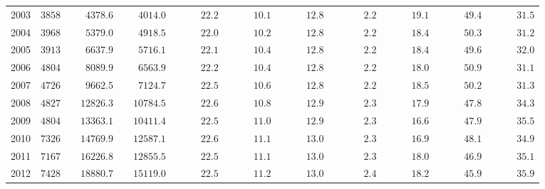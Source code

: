\begin{table}[ht]
{\begin{tabular}{lcccccccccc}
			2003  & $3858$ & $\phantom{000}4378.6$ & $\phantom{000}4014.0$ & $\phantom{00000}22.2$ & $\phantom{00000}10.1$ & $\phantom{00000}12.8$ & $\phantom{000000}2.2$ & $\phantom{00000}19.1$ & $\phantom{00000}49.4$ & $\phantom{00000}31.5$ \\
			2004  & $3968$ & $\phantom{000}5379.0$ & $\phantom{000}4918.5$ & $\phantom{00000}22.0$ & $\phantom{00000}10.2$ & $\phantom{00000}12.8$ & $\phantom{000000}2.2$ & $\phantom{00000}18.4$ & $\phantom{00000}50.3$ & $\phantom{00000}31.2$ \\
			2005  & $3913$ & $\phantom{000}6637.9$ & $\phantom{000}5716.1$ & $\phantom{00000}22.1$ & $\phantom{00000}10.4$ & $\phantom{00000}12.8$ & $\phantom{000000}2.2$ & $\phantom{00000}18.4$ & $\phantom{00000}49.6$ & $\phantom{00000}32.0$ \\
			2006  & $4804$ & $\phantom{000}8089.9$ & $\phantom{000}6563.9$ & $\phantom{00000}22.2$ & $\phantom{00000}10.4$ & $\phantom{00000}12.8$ & $\phantom{000000}2.2$ & $\phantom{00000}18.0$ & $\phantom{00000}50.9$ & $\phantom{00000}31.1$ \\
			2007  & $4726$ & $\phantom{000}9662.5$ & $\phantom{000}7124.7$ & $\phantom{00000}22.5$ & $\phantom{00000}10.6$ & $\phantom{00000}12.8$ & $\phantom{000000}2.2$ & $\phantom{00000}18.5$ & $\phantom{00000}50.2$ & $\phantom{00000}31.3$ \\
			2008  & $4827$ & $\phantom{00}12826.3$ & $\phantom{00}10784.5$ & $\phantom{00000}22.6$ & $\phantom{00000}10.8$ & $\phantom{00000}12.9$ & $\phantom{000000}2.3$ & $\phantom{00000}17.9$ & $\phantom{00000}47.8$ & $\phantom{00000}34.3$ \\
			2009  & $4804$ & $\phantom{00}13363.1$ & $\phantom{00}10411.4$ & $\phantom{00000}22.5$ & $\phantom{00000}11.0$ & $\phantom{00000}12.9$ & $\phantom{000000}2.3$ & $\phantom{00000}16.6$ & $\phantom{00000}47.9$ & $\phantom{00000}35.5$ \\
			2010  & $7326$ & $\phantom{00}14769.9$ & $\phantom{00}12587.1$ & $\phantom{00000}22.6$ & $\phantom{00000}11.1$ & $\phantom{00000}13.0$ & $\phantom{000000}2.3$ & $\phantom{00000}16.9$ & $\phantom{00000}48.1$ & $\phantom{00000}34.9$ \\
			2011  & $7167$ & $\phantom{00}16226.8$ & $\phantom{00}12855.5$ & $\phantom{00000}22.5$ & $\phantom{00000}11.1$ & $\phantom{00000}13.0$ & $\phantom{000000}2.3$ & $\phantom{00000}18.0$ & $\phantom{00000}46.9$ & $\phantom{00000}35.1$ \\
			2012  & $7428$ & $\phantom{00}18880.7$ & $\phantom{00}15119.0$ & $\phantom{00000}22.5$ & $\phantom{00000}11.2$ & $\phantom{00000}13.0$ & $\phantom{000000}2.4$ & $\phantom{00000}18.2$ & $\phantom{00000}45.9$ & $\phantom{00000}35.9$ \\

\end{tabular}}
\end{table}
